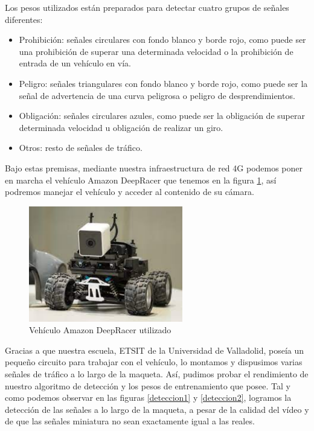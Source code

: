 Los pesos utilizados están preparados para detectar cuatro grupos de señales diferentes:\\
\begin{itemize}
\item Prohibición: señales circulares con fondo blanco y borde rojo, como puede ser una prohibición de superar una determinada velocidad o la prohibición de entrada de un vehículo en vía.
\item Peligro: señales triangulares con fondo blanco y borde rojo, como puede ser la señal de advertencia de una curva peligrosa o peligro de desprendimientos.
\item Obligación: señales circulares azules, como puede ser la obligación de superar determinada velocidad u obligación de realizar un giro.
\item Otros: resto de señales de tráfico.
\end{itemize}

Bajo estas premisas, mediante nuestra infraestructura de red 4G podemos poner en marcha el vehículo Amazon DeepRacer que tenemos en la figura \ref{deepracer}, así podremos manejar el vehículo y acceder al contenido de su cámara.\\

\begin{figure}[H]
    \centering
 	\includegraphics[width=0.6\textwidth]{Imagenes/IA/deepracer.pdf}
    \caption{Vehículo Amazon DeepRacer utilizado}
    \label{deepracer}
\end{figure}

Gracias a que nuestra escuela, ETSIT de la Universidad de Valladolid, poseía un pequeño circuito para trabajar con el vehículo, lo montamos y dispusimos varias señales de tráfico a lo largo de la maqueta. Así, pudimos probar el rendimiento de nuestro algoritmo de detección y los pesos de entrenamiento que posee. Tal y como podemos observar en las figuras \ref{deteccion1} y \ref{deteccion2}, logramos la detección de las señales a lo largo de la maqueta, a pesar de la calidad del vídeo y de que las señales miniatura no sean exactamente igual a las reales. \\

